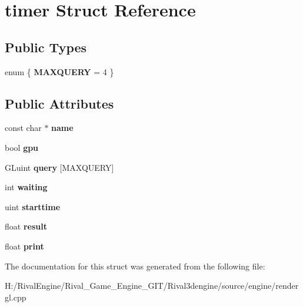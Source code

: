 \hypertarget{structtimer}{}\section{timer Struct Reference}
\label{structtimer}
\subsection*{Public Types}
\begin{DoxyCompactItemize}
\item 
\mbox{\label{structtimer_afc4b624207e6965547a9f785e9dbc57f}} 
enum \{ {\bfseries M\+A\+X\+Q\+U\+E\+RY} = 4
 \}
\end{DoxyCompactItemize}
\subsection*{Public Attributes}
\begin{DoxyCompactItemize}
\item 
\mbox{\label{structtimer_a4ac1cf90019396f9a839d1c6d14c55a7}} 
const char $\ast$ {\bfseries name}
\item 
\mbox{\label{structtimer_a3f02eb35650753c44ae5525ae2d418c3}} 
bool {\bfseries gpu}
\item 
\mbox{\label{structtimer_a945ce5b5e14c7c104560a5f56d739a63}} 
G\+Luint {\bfseries query} \mbox{[}M\+A\+X\+Q\+U\+E\+RY\mbox{]}
\item 
\mbox{\label{structtimer_aeaa40b4ece2e7819b96a28c150412285}} 
int {\bfseries waiting}
\item 
\mbox{\label{structtimer_aaea5f948542894f9aff29705bbf0684f}} 
uint {\bfseries starttime}
\item 
\mbox{\label{structtimer_ad7a0756d7813d093e9b8e5f528ac7056}} 
float {\bfseries result}
\item 
\mbox{\label{structtimer_a2061881f4493f965b35b18460f39bb99}} 
float {\bfseries print}
\end{DoxyCompactItemize}


The documentation for this struct was generated from the following file\+:\begin{DoxyCompactItemize}
\item 
H\+:/\+Rival\+Engine/\+Rival\+\_\+\+Game\+\_\+\+Engine\+\_\+\+G\+I\+T/\+Rival3dengine/source/engine/rendergl.\+cpp\end{DoxyCompactItemize}
